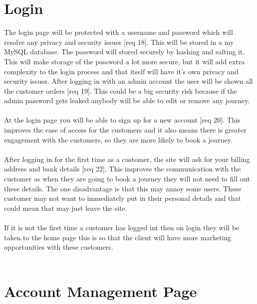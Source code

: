 \documentclass{article}
\begin{document}
\section{Login}
The login page will be protected with a username and password which will resolve any privacy and security issues [req 18]. This will be stored in a my MySQL database. The password will stored securely by hashing and salting it. This will make storage of the password a lot more secure, but it will add extra complexity to the login process and that itself will have it's own privacy and security issues. After logging in with an admin account the user will be shown all the customer orders [req 19]. This could be a big security risk because if the admin password gets leaked anybody will be able to edit or remove any journey.
\\
\\
At the login page you will be able to sign up for a new account [req 20]. This improves the ease of access for the customers and it also means there is greater engagement with the customers, so they are more likely to book a journey.
\\
\\
After logging in for the first time as a customer, the site will ask for your billing address and bank details [req 22]. This improves the communication with the customer as when they are going to book a journey they will not need to fill out these details. The one disadvantage is that this may annoy some users. These customer may not want to immediately put in their personal details and that could mean that may just leave the site.
\\
\\
[req 23] If it is not the first time a customer has logged int then on login they will be taken to the home page this is so that the client will have more marketing opportunities with these customers.
\\
\\
\section{Account Management Page}
\end{document}
